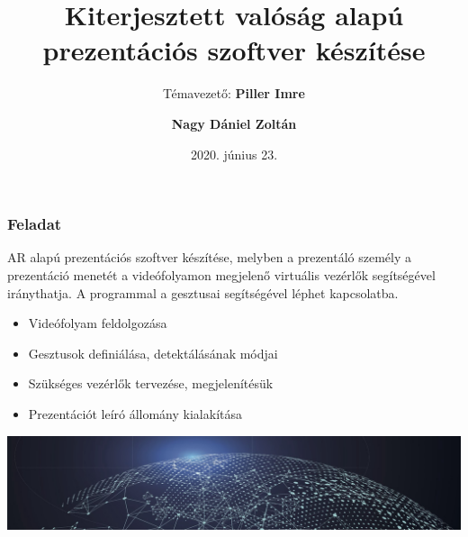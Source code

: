 \documentclass{beamer}
\title[Szakdolgozat védés, 2020. június 23.]{\Huge Kiterjesztett valóság alapú prezentációs szoftver készítése}
\subtitle{\bigskip \large Témavezető: \textbf{\Large Piller Imre}}
\author[Nagy Dániel Zoltán]{\textbf{\LARGE Nagy Dániel Zoltán}}
\institute[]{\Large Miskolci Egyetem}
\date{2020. június 23.}
\begin{document}

\frame{\Large \titlepage}

\begin{frame}[fragile]
\frametitle{Feladat}

AR alapú prezentációs szoftver készítése, melyben a prezentáló személy a prezentáció menetét a videófolyamon megjelenő virtuális vezérlők segítségével iránythatja. A programmal a gesztusai segítségével léphet kapcsolatba.

\medskip
\begin{block}{}
\begin{itemize}
	\item Videófolyam feldolgozása
	\item Gesztusok definiálása, detektálásának módjai
	\item Szükséges vezérlők tervezése, megjelenítésük
	\item Prezentációt leíró állomány kialakítása
\end{itemize}
\end{block}

\medskip

\includegraphics[width=\textwidth]{images/globe.png}

\end{frame}
\end{document}
